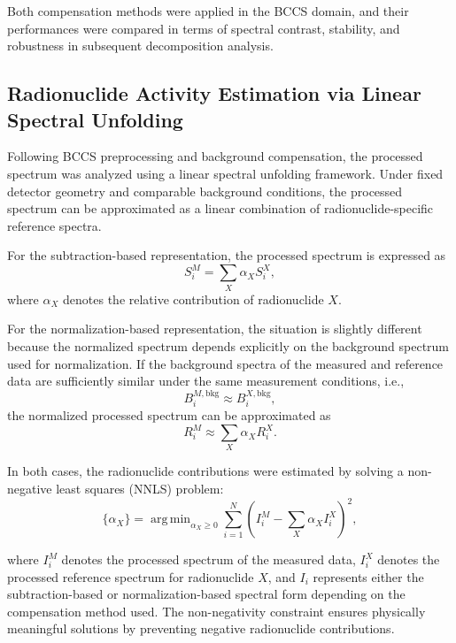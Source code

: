 \documentclass[10pt]{wlscirep}
\DeclareMathOperator*{\argmin}{arg\,min} %
\begin{document}
Both compensation methods were applied in the BCCS domain, and their performances were compared in terms of spectral contrast, stability, and robustness in subsequent decomposition analysis.\normalcolor

\subsection*{Radionuclide Activity Estimation via Linear Spectral Unfolding}
\color{red}
Following BCCS preprocessing and background compensation, the processed spectrum was analyzed using a linear spectral unfolding framework. Under fixed detector geometry and comparable background conditions, the processed spectrum can be approximated as a linear combination of radionuclide-specific reference spectra.

For the subtraction-based representation, the processed spectrum is expressed as
\begin{equation}
S_i^{M} = \sum_{X} \alpha_X S_i^{X},
\label{eqn:subtraction_unfolding}
\end{equation}
where $\alpha_X$ denotes the relative contribution of radionuclide $X$.

For the normalization-based representation, the situation is slightly different because the normalized spectrum depends explicitly on the background spectrum used for normalization. If the background spectra of the measured and reference data are sufficiently similar under the same measurement conditions, i.e.,
\begin{equation}
B_i^{M,\mathrm{bkg}} \approx B_i^{X,\mathrm{bkg}},
\label{eqn:bkg_similarity}
\end{equation}
the normalized processed spectrum can be approximated as
\begin{equation}
R_i^{M} \approx \sum_{X} \alpha_X R_i^{X}.
\label{eqn:ratio_unfolding}
\end{equation}

In both cases, the radionuclide contributions were estimated by solving a non-negative least squares (NNLS) problem:
\begin{equation}
\{\alpha_X\}
=
\argmin_{\alpha_X \ge 0}
\sum_{i=1}^{N}
\left(
I_i^{M} - \sum_{X}\alpha_X I_i^{X}
\right)^2,
\label{eqn:nnls}
\end{equation}

\noindent where $I_i^{M}$ denotes the processed spectrum of the measured data, $I_i^{X}$ denotes the processed reference spectrum for radionuclide $X$, and $I_i$ represents either the subtraction-based or normalization-based spectral form depending on the compensation method used. The non-negativity constraint ensures physically meaningful solutions by preventing negative radionuclide contributions.
\end{document}
